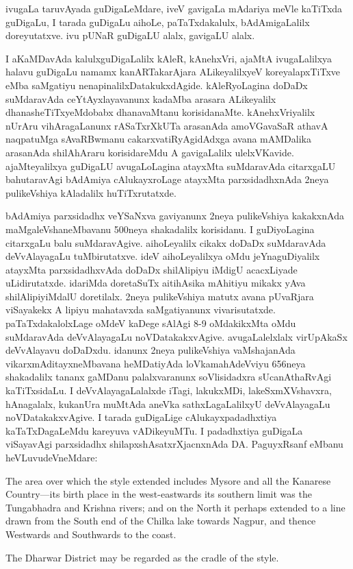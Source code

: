 \documentclass[11pt,a4size]{article}
\begin{document}
ivugaLa taruvAyada guDigaLeMdare, iveV gavigaLa mAdariya meVle
kaTiTxda guDigaLu, I tarada guDigaLu aihoLe, paTaTxdakalulx,
bAdAmigaLalilx doreyutatxve. ivu pUNaR guDigaLU alalx, gavigaLU alalx.

I aKaMDavAda kalulxguDigaLalilx kAleR, kAnehxVri, ajaMtA ivugaLalilxya
halavu guDigaLu namamx kanARTakarAjara ALikeyalilxyeV koreyalapxTiTxve
eMba saMgatiyu nenapinalilxDatakukxdAgide. kAleRyoLagina doDaDx
suMdaravAda ceYtAyxlayavanunx kadaMba arasara ALikeyalilx
dhanasheTiTxyeMdobabx dhanavaMtanu korisidanaMte. kAnehxVriyalilx
nUrAru vihAragaLanunx rASaTxrXkUTa arasanAda amoVGavaSaR athavA
naqpatuMga sAvaRBwmanu cakarxvatiRyAgidAdxga avana mAMDalika arasanAda
shilAhAraru korisidareMdu A gavigaLalilx ulelxVKavide. ajaMteyalilxya
guDigaLU avugaLoLagina atayxMta suMdaravAda citarxgaLU bahutaravAgi
bAdAmiya cAlukayxroLage atayxMta parxsidadhxnAda 2neya pulikeVshiya
kAladalilx huTiTxrutatxde.

bAdAmiya parxsidadhx veYSaNxva gaviyanunx 2neya pulikeVshiya
kakakxnAda maMgaleVshaneMbavanu 500neya shakadalilx korisidanu. I
guDiyoLagina citarxgaLu balu suMdaravAgive. aihoLeyalilx cikakx doDaDx
suMdaravAda deVvAlayagaLu tuMbirutatxve. ideV aihoLeyalilxya oMdu
jeYnaguDiyalilx atayxMta parxsidadhxvAda doDaDx shilAlipiyu iMdigU
acacxLiyade uLidirutatxde. idariMda doretaSuTx aitihAsika mAhitiyu
mikakx yAva shilAlipiyiMdalU doretilalx. 2neya pulikeVshiya matutx
avana pUvaRjara viSayakekx A lipiyu mahatavxda saMgatiyanunx
vivarisutatxde. paTaTxdakalolxLage oMdeV kaDege sAlAgi 8-9 oMdakikxMta
oMdu suMdaravAda deVvAlayagaLu noVDatakakxvAgive. avugaLalelxlalx
virUpAkaSx deVvAlayavu doDaDxdu. idanunx 2neya pulikeVshiya
vaMshajanAda vikarxmAditayxneMbavana heMDatiyAda loVkamahAdeVviyu
656neya shakadalilx tananx gaMDanu palalxvaranunx soVlisidadxra
sUcanAthaRvAgi kaTiTxsidaLu. I deVvAlayagaLalalxde iTagi, lakukxMDi,
lakeSxmXVshavxra, hAnagalalx, kukanUra muMtAda aneVka
sathxLagaLalilxyU deVvAlayagaLu noVDatakakxvAgive. I tarada guDigaLige
cAlukayxpadadhxtiya kaTaTxDagaLeMdu kareyuva vADikeyuMTu. I
padadhxtiya guDigaLa viSayavAgi parxsidadhx shilapxshAsatxrXjacnxnAda
DA. PaguyxRsanf eMbanu heVLuvudeVneMdare:

{
\rm

The area over which the style extended includes Mysore and all the
Kanarese Country---its birth place in the west-eastwards its southern
limit was the Tungabhadra and Krishna rivers; and on the North it
perhaps extended to a line drawn from the South end of the Chilka lake
towards Nagpur, and thence Westwards and Southwards to the coast.

The Dharwar District may be regarded as the cradle of the style.}
\end{document}
